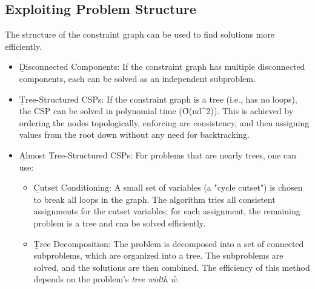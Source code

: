 \subsection{Exploiting Problem Structure}
 The structure of the constraint graph can be used to find solutions more efficiently.
\begin{itemize}
   \item \b{Disconnected Components:} If the constraint graph has multiple disconnected components, each can be solved as an independent subproblem.
   \item \b{Tree-Structured CSPs:} If the constraint graph is a tree (i.e., has no loops), the CSP can be solved in polynomial time (\f{O(nd^2)}). This is achieved by ordering the nodes topologically, enforcing arc consistency, and then assigning values from the root down without any need for backtracking.
  \item \b{Almost Tree-Structured CSPs:} For problems that are nearly trees, one can use:
  \begin{itemize}
     \item \b{Cutset Conditioning:} A small set of variables (a "cycle cutset") is chosen to break all loops in the graph. The algorithm tries all consistent assignments for the cutset variables; for each assignment, the remaining problem is a tree and can be solved efficiently.
     \item \b{Tree Decomposition:} The problem is decomposed into a set of connected subproblems, which are organized into a tree. The subproblems are solved, and the solutions are then combined. The efficiency of this method depends on the problem's \it{tree width} \f{w}.
  \end{itemize}
\end{itemize}
